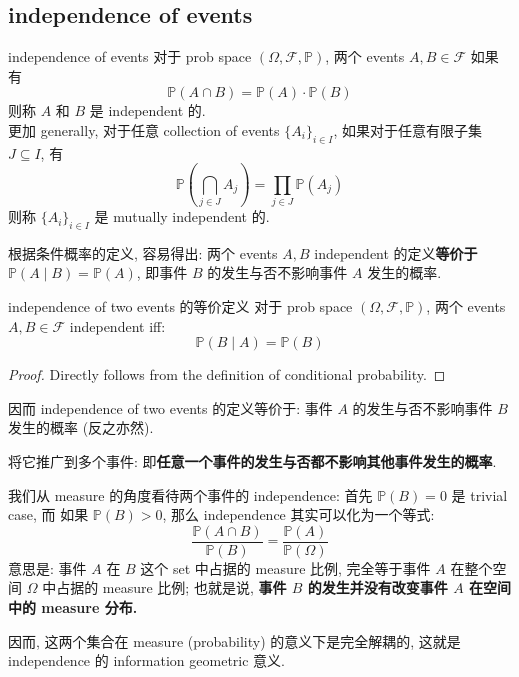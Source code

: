 \subsection{independence of events}
\begin{definition}{independence of events}
    对于 prob space \((\Omega, \mathcal{F}, \mathbb{P})\), 两个 events \(A, B \in \mathcal{F}\) 如果有
    \[
    \mathbb{P}(A \cap B) = \mathbb{P}(A) \cdot \mathbb{P}(B)
    \]
    则称 \(A\) 和 \(B\) 是 independent 的.\\
    更加 generally, 对于任意 collection of events \(\{A_i\}_{i \in I}\), 如果对于任意有限子集 \(J \subseteq I\), 有 
    \[
    \mathbb{P}\left(\bigcap_{j \in J} A_j\right) = \prod_{j \in J} \mathbb{P}(A_j)
    \]
    则称 \(\{A_i\}_{i \in I}\) 是 mutually independent 的.
\end{definition}
\begin{remark}

    根据条件概率的定义, 容易得出: 
    两个 events \(A, B\) independent 
    的定义\textbf{等价于 \(\mathbb{P}(A \mid B) = \mathbb{P}(A)\)}, 即事件 \(B\) 的发生与否不影响事件 \(A\) 发生的概率.\\
\begin{proposition}{independence of two events 的等价定义}
    对于 prob space \((\Omega, \mathcal{F}, \mathbb{P})\), 
    两个 events \(A, B \in \mathcal{F}\) 
    independent 
    iff: 
    \[\mathbb{P}(B \mid A) = \mathbb{P}(B)\]
\end{proposition}
\begin{proof}
Directly follows from the definition of conditional probability.
\end{proof}
因而 independence of two events 的定义等价于: 
事件 \(A\) 的发生与否不影响事件 \(B\) 发生的概率 (反之亦然).

将它推广到多个事件: 即\textbf{任意一个事件的发生与否都不影响其他事件发生的概率}.
\end{remark}
\begin{remark}
    
我们从 measure 的角度看待两个事件的 independence: 
首先 $\mathbb{P}(B) = 0$ 是 trivial case, 而
如果 $\mathbb{P}(B) > 0$, 那么 independence 其实可以化为一个等式:
$$\frac{\mathbb{P}(A \cap B)}{\mathbb{P}(B)} = \frac{\mathbb{P}(A)}{\mathbb{P}(\Omega)}$$
意思是: 事件 $A$ 在 $B$ 这个 set 中占据的 measure 比例, 
完全等于事件 $A$ 在整个空间 $\Omega$ 中占据的 measure 比例; 
也就是说, \textbf{事件 $B$ 的发生并没有改变事件 $A$ 在空间中的 measure 分布.}

因而, 这两个集合在 measure (probability) 的意义下是完全解耦的, 
这就是 independence 的 information geometric 意义.
\end{remark}


